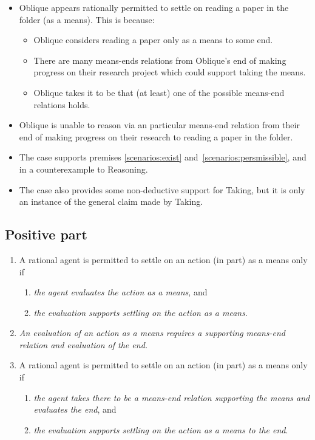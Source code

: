 \documentclass[10pt]{article}
\newcommand{\hozlinedash}[0]{%
  \noindent\hdashrule[0.5ex][c]{\textwidth}{.1pt}{2.5pt}
}
\newcommand{\schemaName}[1]{\textsf{#1}}
\begin{document}
\begin{itemize}
\item Oblique appears rationally permitted to settle on reading a paper in the folder (as a means).
  This is because:
  \begin{itemize}
  \item Oblique considers reading a paper only as a means to some end.
  \item There are many means-ends relations from Oblique's end of making progress on their research project which could support taking the means.
  \item Oblique takes it to be that (at least) one of the possible means-end relations holds.
  \end{itemize}
\item Oblique is unable to reason via an particular means-end relation from their end of making progress on their research to reading a paper in the folder.
\end{itemize}


\begin{itemize}
\item The case supports premises \ref{scenarios:exist} and~\ref{scenarios:persmissible}, and in a counterexample to \schemaName{Reasoning}.
\item The case also provides some non-deductive support for \schemaName{Taking}, but it is only an instance of the general claim made by \schemaName{Taking}.
\end{itemize}


\newpage

\subsection{Positive part}
\label{sec:positive-part}

\hozlinedash

\begin{enumerate}[label=P\arabic*., ref=(P\arabic*)]
\item A rational agent is permitted to settle on an action (in part) as a means only if
  \begin{enumerate}[label=P\arabic{enumi}\alph*., ref=(P\arabic{enumi}\alph*)]
  \item \emph{the agent evaluates the action as a means}, and
  \item \emph{the evaluation supports settling on the action as a means}.
  \end{enumerate}
\item \emph{An evaluation of an action as a means requires a supporting means-end relation and evaluation of the end.}
\item A rational agent is permitted to settle on an action (in part) as a means only if
  \begin{enumerate}[label=P\arabic{enumi}\alph*., ref=(P\arabic{enumi}\alph*)]
  \item \emph{the agent takes there to be a means-end relation supporting the means and evaluates the end}, and
  \item \emph{the evaluation supports settling on the action as a means to the end}.
  \end{enumerate}
\end{enumerate}
\end{document}
